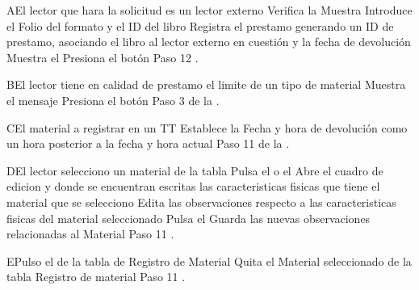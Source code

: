 		\begin{UCtrayectoriaA}{A}{El lector que hara la solicitud es un lector externo}
			\UCpaso[\UCsist] Verifica la  
			\UCpaso[\UCsist] Muestra 
			\UCpaso[\UCactor] Introduce el Folio del formato y el ID del libro
			\UCpaso[\UCsist] Registra el prestamo generando un ID de prestamo, asociando el libro al lector externo en cuestión y la fecha de devolución
			\UCpaso[\UCsist] Muestra el 
			\UCpaso[\UCactor] Presiona el botón 
			\UCpaso[\UCsist] Paso 12 .
		\end{UCtrayectoriaA}
		\begin{UCtrayectoriaA}{B}{El lector tiene en calidad de prestamo el limite de un tipo de material}
			\UCpaso[\UCsist] Muestra el mensaje 
			\UCpaso[\UCactor] Presiona el botón 
			\UCpaso[\UCsist] Paso 3 de la .
		\end{UCtrayectoriaA}
		\begin{UCtrayectoriaA}{C}{El material a registrar en un TT}
			\UCpaso[\UCsist] Establece la Fecha y hora de devolución como un hora posterior a la fecha y hora actual
			\UCpaso[\UCsist] Paso 11 de la .
		\end{UCtrayectoriaA}
		\begin{UCtrayectoriaA}{D}{El lector selecciono un material de la tabla}
			\UCpaso[\UCsist] Pulsa el  o el 
			\UCpaso[\UCsist] Abre el cuadro de edicion y donde se encuentran escritas las caracteristicas fisicas que tiene el material que se selecciono
			\UCpaso[\UCactor] Edita las observaciones respecto a las caracteristicas fisicas del material seleccionado
			\UCpaso[\UCactor] Pulsa el 
			\UCpaso[\UCsist] Guarda las nuevas observaciones relacionadas al Material
			\UCpaso[\UCsist] Paso 11 .
		\end{UCtrayectoriaA}
		
		\begin{UCtrayectoriaA}{E}{Pulso el  de la tabla de Registro de Material}
			\UCpaso[\UCsist] Quita el Material seleccionado de la tabla Registro de material
			\UCpaso[\UCsist] Paso 11 .
		\end{UCtrayectoriaA}
			
